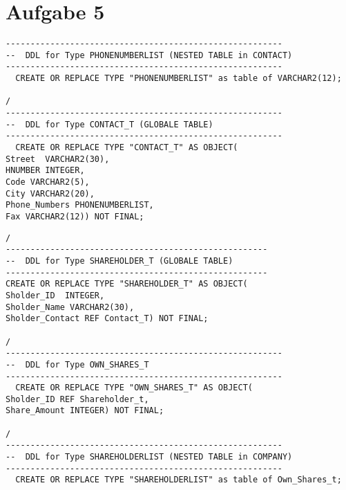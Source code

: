 \documentclass{scrartcl}
\begin{document}
\section*{Aufgabe 5}
\begin{lstlisting}
--------------------------------------------------------
--  DDL for Type PHONENUMBERLIST (NESTED TABLE in CONTACT)
--------------------------------------------------------
  CREATE OR REPLACE TYPE "PHONENUMBERLIST" as table of VARCHAR2(12);

/
--------------------------------------------------------
--  DDL for Type CONTACT_T (GLOBALE TABLE)
--------------------------------------------------------
  CREATE OR REPLACE TYPE "CONTACT_T" AS OBJECT(
Street  VARCHAR2(30),
HNUMBER INTEGER,
Code VARCHAR2(5),
City VARCHAR2(20),
Phone_Numbers PHONENUMBERLIST,
Fax VARCHAR2(12)) NOT FINAL;
\end{lstlisting}

\begin{lstlisting}
/
-----------------------------------------------------
--  DDL for Type SHAREHOLDER_T (GLOBALE TABLE)
-----------------------------------------------------
CREATE OR REPLACE TYPE "SHAREHOLDER_T" AS OBJECT(
Sholder_ID  INTEGER,
Sholder_Name VARCHAR2(30),
Sholder_Contact REF Contact_T) NOT FINAL;

/
--------------------------------------------------------
--  DDL for Type OWN_SHARES_T 
--------------------------------------------------------
  CREATE OR REPLACE TYPE "OWN_SHARES_T" AS OBJECT(
Sholder_ID REF Shareholder_t,
Share_Amount INTEGER) NOT FINAL;

/
--------------------------------------------------------
--  DDL for Type SHAREHOLDERLIST (NESTED TABLE in COMPANY)
--------------------------------------------------------
  CREATE OR REPLACE TYPE "SHAREHOLDERLIST" as table of Own_Shares_t;
\end{lstlisting}
\end{document}
